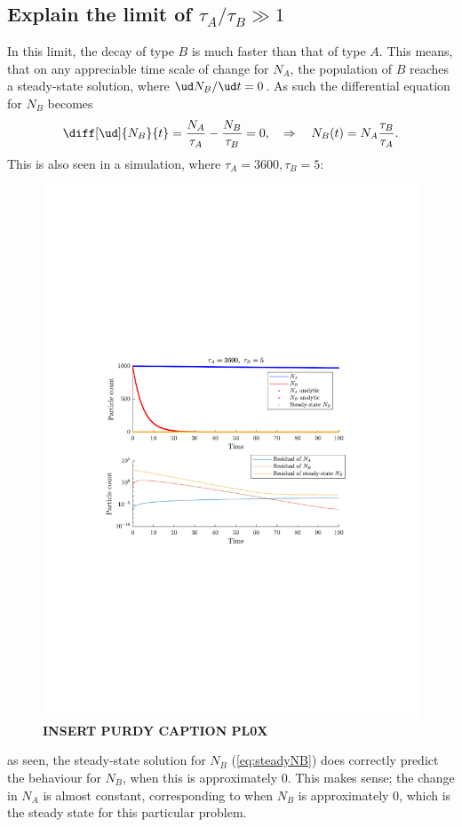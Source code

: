 \documentclass[a4paper,10pt]{article} 	%
\numberwithin{equation}{section}
\begin{document}
	\subsection{Explain the limit of $ \tau_A/\tau_B \gg 1 $}
	In this limit, the decay of type $ B $ is much faster than that of type $ A $. This means, that on any appreciable time scale of change for $ N_A $, the population of $ B $ reaches a steady-state solution, where $ \ud N_B/\ud t = 0 $. As such the differential equation for $ N_B $ becomes
	\begin{equation}\label{eq:steadyNB}
		\diff[\ud]{N_B}{t} = \frac{N_A}{\tau_A} - \frac{N_B}{\tau_B} = 0, \quad \Rightarrow \quad N_B(t) = N_A \frac{\tau_B}{\tau_A}.
	\end{equation}
	This is also seen in a simulation, where $ \tau_A = 3600,\tau_B = 5 $:
	\begin{figure}[H]
		\centering
		\includegraphics[width=0.7\linewidth]{largetau.pdf}
		\caption{\textbf{INSERT PURDY CAPTION PL0X}}
		\label{fig:largeTau}
	\end{figure}
	as seen, the steady-state solution for $ N_B $ (\eqref{eq:steadyNB}) does correctly predict the behaviour for $ N_B $, when this is approximately 0. This makes sense; the change in $ N_A $ is almost constant, corresponding to when $ N_B $ is approximately 0, which is the steady state for this particular problem.
	
\end{document}
